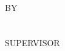 \documentclass[a4paper]{memoir}
\begin{document}
	\thispagestyle{empty}
	\begin{LARGE}
		\begin{center}
			\MakeTextUppercase{\myTitle}\\
			\vfill
			BY\\
			\vfill
			\MakeTextUppercase{\myName}\\
			\MakeTextUppercase{\myMatric}\\
			\vfill
			\MakeTextUppercase{Supervisor}\\
			\MakeTextUppercase{\mySupervisor}\\
			\vfill
			\MakeTextUppercase{\myUni}\\
			\vfill
			\myYear
		\end{center}
	\end{LARGE}
	
\end{document}
